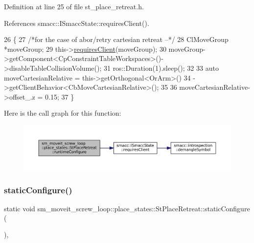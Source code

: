 Definition at line 25 of file st\+\_\+place\+\_\+retreat.\+h.



References smacc\+::\+I\+Smacc\+State\+::requires\+Client().


\begin{DoxyCode}
26             \{
27                 \textcolor{comment}{/*for the case of abor/retry cartesian retreat --*/}
28                 ClMoveGroup *moveGroup;
29                 this->\hyperlink{classsmacc_1_1ISmaccState_a7f95c9f0a6ea2d6f18d1aec0519de4ac}{requiresClient}(moveGroup);
30                 moveGroup->getComponent<CpConstraintTableWorkspaces>()->disableTableCollisionVolume();
31                 ros::Duration(1).sleep();
32 
33                 \textcolor{keyword}{auto} moveCartesianRelative = this->getOrthogonal<OrArm>()
34                                                  ->getClientBehavior<CbMoveCartesianRelative>();
35 
36                 moveCartesianRelative->offset\_.z = 0.15;
37             \}
\end{DoxyCode}
Here is the call graph for this function\+:
\nopagebreak
\begin{figure}[H]
\begin{center}
\leavevmode
\includegraphics[width=350pt]{structsm__moveit__screw__loop_1_1place__states_1_1StPlaceRetreat_a74e966563a375d884f40641e85483e99_cgraph}
\end{center}
\end{figure}
\mbox{\label{structsm__moveit__screw__loop_1_1place__states_1_1StPlaceRetreat_abdeefc016bcd4a4fcfa3a88e0907152f}} 
\subsubsection{\texorpdfstring{static\+Configure()}{staticConfigure()}}
{\footnotesize\ttfamily static void sm\+\_\+moveit\+\_\+screw\+\_\+loop\+::place\+\_\+states\+::\+St\+Place\+Retreat\+::static\+Configure (\begin{DoxyParamCaption}{ }\end{DoxyParamCaption})\hspace{0.3cm}{\ttfamily [inline]}, {\ttfamily [static]}}



